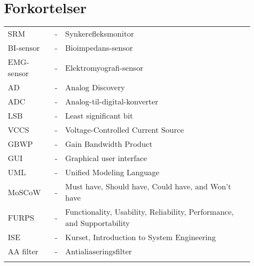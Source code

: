 \chapter{Forkortelser}

\begin{table}[H]
\center
{}
\begin{tabularx}{\linewidth}{l l X}	
SRM         & - &	Synkerefleksmonitor 	\\ \addlinespace[2mm]
BI-sensor    & - &   Bioimpedans-sensor 		\\ \addlinespace[2mm]
EMG-sensor   & - & 	Elektromyografi-sensor 	\\ \addlinespace[2mm]

AD  		& - &  	Analog Discovery  		\\ \addlinespace[2mm]
ADC  		& - &  	Analog-til-digital-konverter  \\ \addlinespace[2mm]
LSB  		& - & 	Least significant bit	\\ \addlinespace[2mm]
VCCS 		& - & 	Voltage-Controlled Current Source  \\ \addlinespace[2mm]
GBWP 		& - &  	Gain Bandwidth Product  \\ \addlinespace[2mm]
GUI 		& - &  	Graphical user interface  \\ \addlinespace[2mm]
UML 		& - &  	Unified Modeling Language  \\ \addlinespace[2mm]
MoSCoW          & - &   Must have, Should have, Could have, and Won't have \\ \addlinespace[2mm]
FURPS           & - &   Functionality, Usability, Reliability, Performance, and Supportability \\ \addlinespace[2mm]

ISE           & - &   Kurset, Introduction to System Engineering \\ \addlinespace[2mm]

AA filter           & - &   Antialiaseringsfilter \\ \addlinespace[2mm]
\end{tabularx}
\end{table}